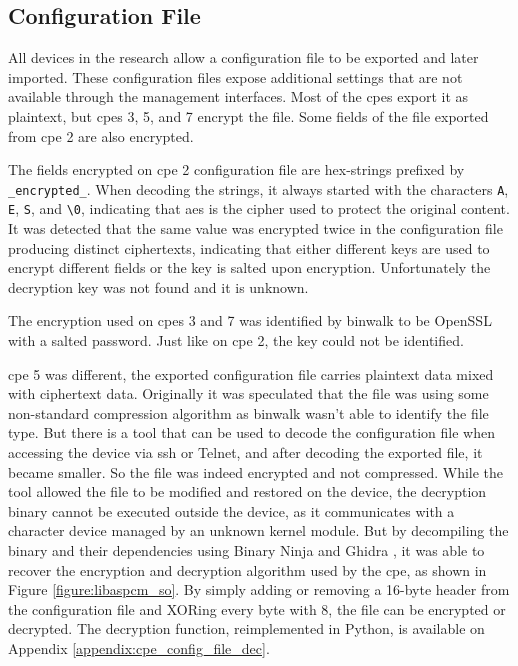 \subsection{Configuration File}

All devices in the research allow a configuration file to be exported and later imported. These configuration files expose additional settings that are not available through the management interfaces. Most of the \glspl{cpe} export it as plaintext, but \glspl{cpe} 3, 5, and 7 encrypt the file. Some fields of the file exported from \gls{cpe} 2 are also encrypted.

The fields encrypted on \gls{cpe} 2 configuration file are hex-strings prefixed by \texttt{\_encrypted\_}. When decoding the strings, it always started with the characters \texttt{A}, \texttt{E}, \texttt{S}, and \texttt{\textbackslash0}, indicating that \gls{aes} is the cipher used to protect the original content. It was detected that the same value was encrypted twice in the configuration file producing distinct ciphertexts, indicating that either different keys are used to encrypt different fields or the key is salted upon encryption. Unfortunately the decryption key was not found and it is unknown. 

The encryption used on \glspl{cpe} 3 and 7 was identified by binwalk \cite{binwalk} to be OpenSSL with a salted password. Just like on \gls{cpe} 2, the key could not be identified.

\gls{cpe} 5 was different, the exported configuration file carries plaintext data mixed with ciphertext data. Originally it was speculated that the file was using some non-standard compression algorithm as binwalk wasn’t able to identify the file type. But there is a tool that can be used to decode the configuration file when accessing the device via \gls{ssh} or Telnet, and after decoding the exported file, it became smaller. So the file was indeed encrypted and not compressed. While the tool allowed the file to be modified and restored on the device, the decryption binary cannot be executed outside the device, as it communicates with a character device managed by an unknown kernel module. But by decompiling the binary and their dependencies using Binary Ninja \cite{binary_ninja} and Ghidra \cite{ghidra}, it was able to recover the encryption and decryption algorithm used by the \gls{cpe}, as shown in Figure \ref{figure:libaspcm_so}. By simply adding or removing a 16-byte header from the configuration file and XORing every byte with 8, the file can be encrypted or decrypted. The decryption function, reimplemented in Python, is available on Appendix \ref{appendix:cpe_config_file_dec}.

